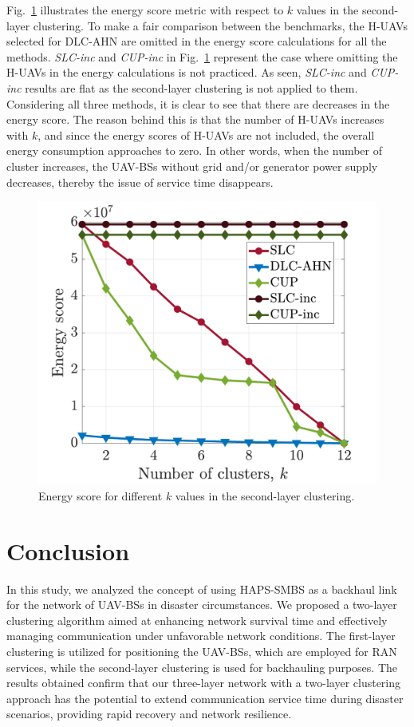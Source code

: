 \documentclass[conference, a4paper]{IEEEtran}
\begin{document}
Fig.~\ref{fig:energy3} illustrates the energy score metric with respect to $k$ values in the second-layer clustering. 
To make a fair comparison between the benchmarks, the H-UAVs selected for DLC-AHN are omitted in the energy score calculations for all the methods.
\textit{SLC-inc} and \textit{CUP-inc} in Fig.~\ref{fig:energy3} represent the case where omitting the H-UAVs in the energy calculations is not practiced.
As seen, \textit{SLC-inc} and \textit{CUP-inc} results are flat as the second-layer clustering is not applied to them.
Considering all three methods, it is clear to see that there are decreases in the energy score.
The reason behind this is that the number of H-UAVs increases with $k$, and since the energy scores of H-UAVs are not included, the overall energy consumption approaches to zero.
In other words, when the number of cluster increases, the UAV-BSs without grid and/or generator power supply decreases, thereby the issue of service time disappears.
\begin{figure}[h!]
    \centering
     \shorthandoff{=}
    \includegraphics[width=.74\linewidth]{Figures/Energy3-eps-converted-to.pdf}
    \shorthandoff{=}
    \caption{Energy score for different $k$ values in the second-layer clustering.}
    \label{fig:energy3}
\end{figure}

\section{Conclusion}
In this study, we analyzed the concept of using HAPS-SMBS as a backhaul link for the network of UAV-BSs in disaster circumstances.
We proposed a two-layer clustering algorithm aimed at enhancing network survival time and effectively managing communication under unfavorable network conditions.
The first-layer clustering is utilized for positioning the UAV-BSs, which are employed for RAN services, while the second-layer clustering is used for backhauling purposes.
The results obtained confirm that our three-layer network with a two-layer clustering approach has the potential to extend communication service time during disaster scenarios, providing rapid recovery and network resilience.



\end{document}
